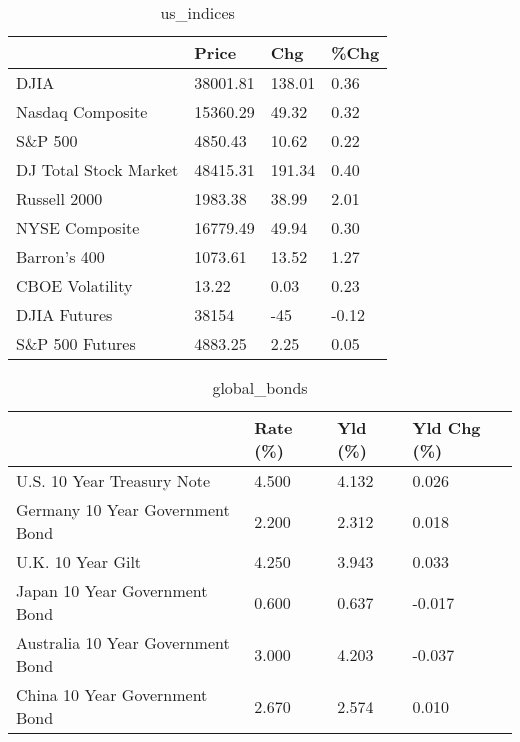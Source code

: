 \documentclass{article}%
\begin{document}
%


\begin{table}[htbp]%
\caption{us\_indices}%
\centering%
\begin{adjustbox}{width=1\textwidth}%
\begin{tabular}{llll}
\toprule
                      &    Price &    Chg &  \%Chg \\
\midrule
                 DJIA & 38001.81 & 138.01 &  0.36 \\
     Nasdaq Composite & 15360.29 &  49.32 &  0.32 \\
              S\&P 500 &  4850.43 &  10.62 &  0.22 \\
DJ Total Stock Market & 48415.31 & 191.34 &  0.40 \\
         Russell 2000 &  1983.38 &  38.99 &  2.01 \\
       NYSE Composite & 16779.49 &  49.94 &  0.30 \\
         Barron's 400 &  1073.61 &  13.52 &  1.27 \\
      CBOE Volatility &    13.22 &   0.03 &  0.23 \\
         DJIA Futures &    38154 &    -45 & -0.12 \\
      S\&P 500 Futures &  4883.25 &   2.25 &  0.05 \\
\bottomrule
\end{tabular}
%
\end{adjustbox}%
\end{table}

%


\begin{table}[htbp]%
\caption{global\_bonds}%
\centering%
\begin{adjustbox}{width=1\textwidth}%
\begin{tabular}{llll}
\toprule
                                  & Rate (\%) & Yld (\%) & Yld Chg (\%) \\
\midrule
       U.S. 10 Year Treasury Note &    4.500 &   4.132 &       0.026 \\
  Germany 10 Year Government Bond &    2.200 &   2.312 &       0.018 \\
                U.K. 10 Year Gilt &    4.250 &   3.943 &       0.033 \\
    Japan 10 Year Government Bond &    0.600 &   0.637 &      -0.017 \\
Australia 10 Year Government Bond &    3.000 &   4.203 &      -0.037 \\
    China 10 Year Government Bond &    2.670 &   2.574 &       0.010 \\
\bottomrule
\end{tabular}
%
\end{adjustbox}%
\end{table}
\end{document}
